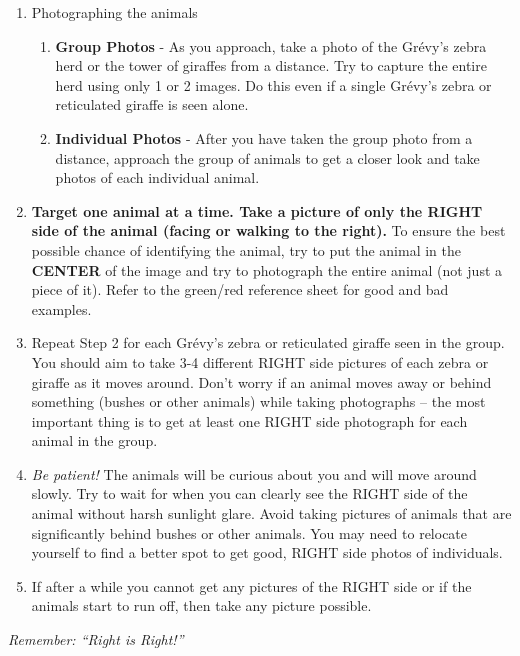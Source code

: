 \begin{enumerate}
    \item Photographing the animals
          \begin{enumerate}
              \item \textbf{Group Photos} - As you approach, take a photo of the Gr\'evy's zebra herd or the tower of giraffes from a distance.  Try to capture the entire herd using only 1 or 2 images. Do this even if a single Gr\'evy's zebra or reticulated giraffe is seen alone.
              \item \textbf{Individual Photos} - After you have taken the group photo from a distance, approach the group of animals to get a closer look and take photos of each individual animal.
          \end{enumerate}
    \item \textbf{Target one animal at a time.  Take a picture of only the RIGHT side of the animal (facing or walking to the right).}  To ensure the best possible chance of identifying the animal, try to put the animal in the \textbf{CENTER} of the image and try to photograph the entire animal (not just a piece of it).  Refer to the green/red reference sheet for good and bad examples.
    \item Repeat Step 2 for each Gr\'evy's zebra or reticulated giraffe seen in the group.  You should aim to take 3-4 different RIGHT side pictures of each zebra or giraffe as it moves around.  Don't worry if an animal moves away or behind something (bushes or other animals) while taking photographs – the most important thing is to get at least one RIGHT side photograph for each animal in the group.
    \item \textit{Be patient!}  The animals will be curious about you and will move around slowly.  Try to wait for when you can clearly see the RIGHT side of the animal without harsh sunlight glare.  Avoid taking pictures of animals that are significantly behind bushes or other animals.  You may need to relocate yourself to find a better spot to get good, RIGHT side photos of individuals.
    \item If after a while you cannot get any pictures of the RIGHT side or if the animals start to run off, then take any picture possible.
\end{enumerate}

\newpage

\begin{center}
    \textit{
        \large{
            Remember: ``Right is Right!''
        }
    }
\end{center}

